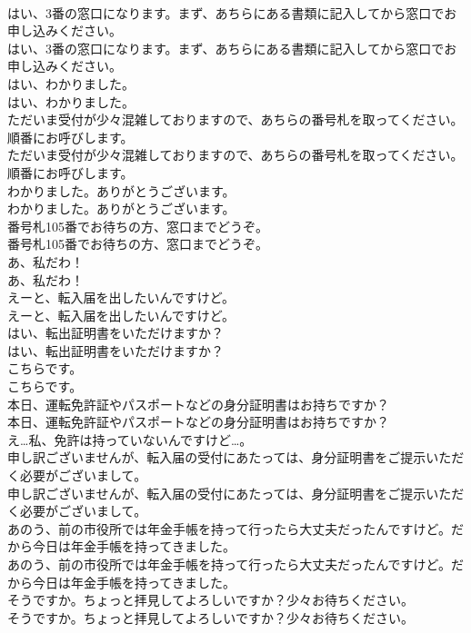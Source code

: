 \documentclass[8pt]{extreport}
\begin{document}
\begin{CJK}{UTF8}{min}
\\	はい、3番の窓口になります。まず、あちらにある書類に記入してから窓口でお申し込みください。	
\\	はい、3番の窓口になります。まず、あちらにある書類に記入してから窓口でお申し込みください。 
\\	はい、わかりました。	
\\	はい、わかりました。 
\\	ただいま受付が少々混雑しておりますので、あちらの番号札を取ってください。順番にお呼びします。	
\\	ただいま受付が少々混雑しておりますので、あちらの番号札を取ってください。順番にお呼びします。 
\\	わかりました。ありがとうございます。	
\\	わかりました。ありがとうございます。 
\\	番号札105番でお待ちの方、窓口までどうぞ。	
\\	番号札105番でお待ちの方、窓口までどうぞ。 
\\	あ、私だわ！	
\\	あ、私だわ！ 
\\	えーと、転入届を出したいんですけど。	
\\	えーと、転入届を出したいんですけど。 
\\	はい、転出証明書をいただけますか？	
\\	はい、転出証明書をいただけますか？ 
\\	こちらです。	
\\	こちらです。 
\\	本日、運転免許証やパスポートなどの身分証明書はお持ちですか？	
\\	本日、運転免許証やパスポートなどの身分証明書はお持ちですか？ 
\\	え…私、免許は持っていないんですけど…。	
\\	申し訳ございませんが、転入届の受付にあたっては、身分証明書をご提示いただく必要がございまして。	
\\	申し訳ございませんが、転入届の受付にあたっては、身分証明書をご提示いただく必要がございまして。 
\\	あのう、前の市役所では年金手帳を持って行ったら大丈夫だったんですけど。だから今日は年金手帳を持ってきました。	
\\	あのう、前の市役所では年金手帳を持って行ったら大丈夫だったんですけど。だから今日は年金手帳を持ってきました。 
\\	そうですか。ちょっと拝見してよろしいですか？少々お待ちください。	
\\	そうですか。ちょっと拝見してよろしいですか？少々お待ちください。 

\end{CJK}
\end{document}
